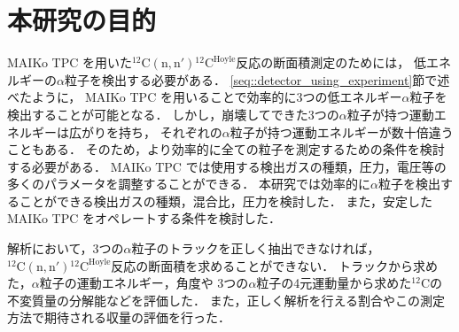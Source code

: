 \documentclass[../master]{subfiles}
\begin{document}

\section{本研究の目的}
MAIKo TPC を用いた${}^{12}\mathrm{C}(\mathrm{n},\mathrm{n}'){}^{12}\mathrm{C}^{\text{Hoyle}}$反応の断面積測定のためには，
低エネルギーの$\alpha$粒子を検出する必要がある．
\ref{seq::detector_using_experiment}節で述べたように，
MAIKo TPC を用いることで効率的に3つの低エネルギー$\alpha$粒子を検出することが可能となる．
しかし，崩壊してできた3つの$\alpha$粒子が持つ運動エネルギーは広がりを持ち，
それぞれの$\alpha$粒子が持つ運動エネルギーが数十倍違うこともある．
そのため，より効率的に全ての粒子を測定するための条件を検討する必要がある．
MAIKo TPC では使用する検出ガスの種類，圧力，電圧等の多くのパラメータを調整することができる．
本研究では効率的に$\alpha$粒子を検出することができる検出ガスの種類，混合比，圧力を検討した．
また，安定したMAIKo TPC をオペレートする条件を検討した．

解析において，3つの$\alpha$粒子のトラックを正しく抽出できなければ，
${}^{12}\mathrm{C}(\mathrm{n},\mathrm{n}'){}^{12}\mathrm{C}^{\text{Hoyle}}$反応の断面積を求めることができない．
トラックから求めた，$\alpha$粒子の運動エネルギー，角度や
3つの$\alpha$粒子の4元運動量から求めた${}^{12}\mathrm{C}$の不変質量の分解能などを評価した．
また，正しく解析を行える割合やこの測定方法で期待される収量の評価を行った．
\end{document}
